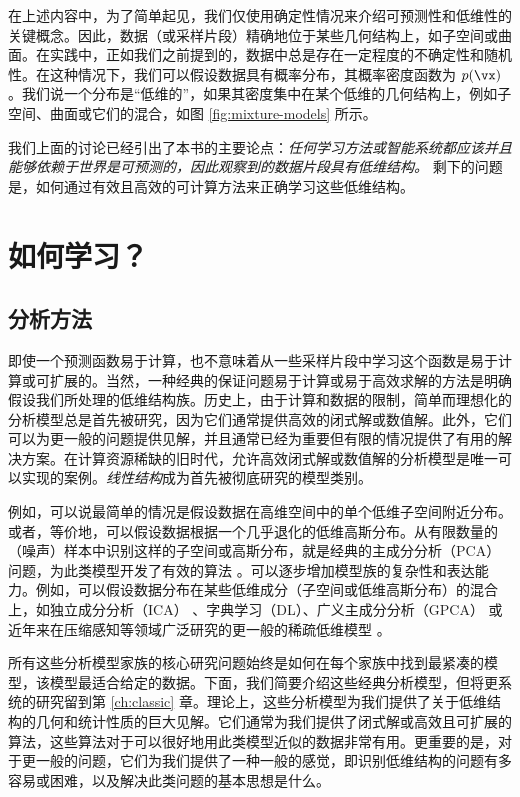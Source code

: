 \documentclass[../../book-main.tex]{subfiles}
\begin{document}
在上述内容中，为了简单起见，我们仅使用确定性情况来介绍可预测性和低维性的关键概念。因此，数据（或采样片段）精确地位于某些几何结构上，如子空间或曲面。在实践中，正如我们之前提到的，数据中总是存在一定程度的不确定性和随机性。在这种情况下，我们可以假设数据具有概率分布，其概率密度函数为 $p(\vx)$。我们说一个分布是“低维的”，如果其密度集中在某个低维的几何结构上，例如子空间、曲面或它们的混合，如图 \ref{fig:mixture-models} 所示。

我们上面的讨论已经引出了本书的主要论点：{\em 任何学习方法或智能系统都应该并且能够依赖于世界是可预测的，因此观察到的数据片段具有低维结构。} 剩下的问题是，如何通过有效且高效的可计算方法来正确学习这些低维结构。

\section{如何学习？}

\subsection{分析方法}
\label{sec:analytical}
即使一个预测函数易于计算，也不意味着从一些采样片段中学习这个函数是易于计算或可扩展的。当然，一种经典的保证问题易于计算或易于高效求解的方法是明确假设我们所处理的低维结构族。历史上，由于计算和数据的限制，简单而理想化的分析模型总是首先被研究，因为它们通常提供高效的闭式解或数值解。此外，它们可以为更一般的问题提供见解，并且通常已经为重要但有限的情况提供了有用的解决方案。在计算资源稀缺的旧时代，允许高效闭式解或数值解的分析模型是唯一可以实现的案例。{\em 线性结构}成为首先被彻底研究的模型类别。

例如，可以说最简单的情况是假设数据在高维空间中的单个低维子空间附近分布。或者，等价地，可以假设数据根据一个几乎退化的低维高斯分布。从有限数量的（噪声）样本中识别这样的子空间或高斯分布，就是经典的主成分分析（PCA）问题，为此类模型开发了有效的算法 \cite{JolliffeI2002}。可以逐步增加模型族的复杂性和表达能力。例如，可以假设数据分布在某些低维成分（子空间或低维高斯分布）的混合上，如独立成分分析（ICA） \cite{Ans-1985}、字典学习（DL）、广义主成分分析（GPCA） \cite{Vidal-GPCA} 或近年来在压缩感知等领域广泛研究的更一般的稀疏低维模型 \cite{Wright-Ma-2022}。

所有这些分析模型家族的核心研究问题始终是如何在每个家族中找到最紧凑的模型，该模型最适合给定的数据。下面，我们简要介绍这些经典分析模型，但将更系统的研究留到第 \ref{ch:classic} 章。理论上，这些分析模型为我们提供了关于低维结构的几何和统计性质的巨大见解。它们通常为我们提供了闭式解或高效且可扩展的算法，这些算法对于可以很好地用此类模型近似的数据非常有用。更重要的是，对于更一般的问题，它们为我们提供了一种一般的感觉，即识别低维结构的问题有多容易或困难，以及解决此类问题的基本思想是什么。
\end{document}
